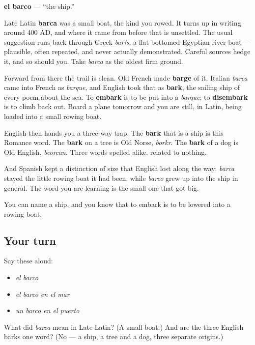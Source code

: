 \begin{cousinweb}
\textbf{el barco} — \textquotedblleft{}the ship.\textquotedblright{}

Late Latin \textbf{barca} was a small boat, the kind you rowed. It turns up in writing around 400 AD, and where it came from before that is unsettled. The usual suggestion runs back through Greek \emph{baris}, a flat-bottomed Egyptian river boat — plausible, often repeated, and never actually demonstrated. Careful sources hedge it, and so should you. Take \emph{barca} as the oldest firm ground.

Forward from there the trail is clean. Old French made \textbf{barge} of it. Italian \emph{barca} came into French as \emph{barque}, and English took that as \textbf{bark}, the sailing ship of every poem about the sea. To \textbf{embark} is to be put into a \emph{barque}; to \textbf{disembark} is to climb back out. Board a plane tomorrow and you are still, in Latin, being loaded into a small rowing boat.

English then hands you a three-way trap. The \textbf{bark} that is a ship is this Romance word. The \textbf{bark} on a tree is Old Norse, \emph{borkr}. The \textbf{bark} of a dog is Old English, \emph{beorcan}. Three words spelled alike, related to nothing.

And Spanish kept a distinction of size that English lost along the way: \emph{barca} stayed the little rowing boat it had been, while \emph{barco} grew up into the ship in general. The word you are learning is the small one that got big.
\end{cousinweb}

\begin{grammarlens}[title={What you've built}]
You can name a ship, and you know that to embark is to be lowered into a rowing boat.
\end{grammarlens}

\subsection*{Your turn}
Say these aloud:

\begin{itemize}
\raggedright
  \item \emph{el barco}
  \item \emph{el barco en el mar}
  \item \emph{un barco en el puerto}
\end{itemize}

\begin{tcolorbox}[breakable,colback=teal!4,colframe=teal!35!black,title={Before you move on}]
What did \emph{barca} mean in Late Latin? (A small boat.) And are the three English barks one word? (No — a ship, a tree and a dog, three separate origins.)
\end{tcolorbox}
